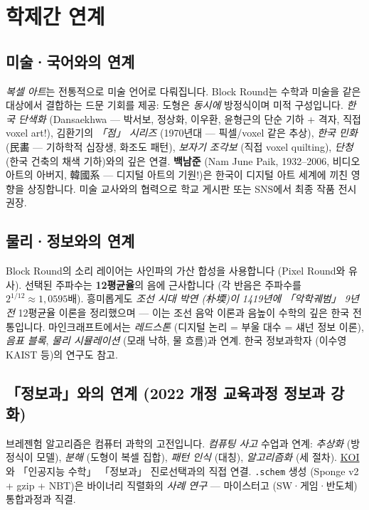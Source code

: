 \documentclass[12pt,a4paper]{scrartcl}
\newcommand{\acc}[1]{\textcolor{accent}{\textbf{#1}}}
\begin{document}
\section{학제간 연계}\label{sec:interdisc}

\subsection{미술·국어와의 연계}
\emph{복셀 아트}는 전통적으로 미술 언어로 다뤄집니다. Block Round는 수학과 미술을 같은 대상에서 결합하는 드문 기회를 제공: 도형은 \emph{동시에} 방정식이며 미적 구성입니다. \emph{한국 단색화} (Dansaekhwa --- 박서보, 정상화, 이우환, 윤형근의 단순 기하 + 격자, 직접 voxel art!), 김환기의 \emph{「점」 시리즈} (1970년대 --- 픽셀/voxel 같은 추상), \emph{한국 민화} (民畵 --- 기하학적 십장생, 화조도 패턴), \emph{보자기 조각보} (직접 voxel quilting), \emph{단청} (한국 건축의 채색 기하)와의 깊은 연결. \acc{백남준} (Nam June Paik, 1932--2006, 비디오 아트의 아버지, 韓國系 --- 디지털 아트의 기원!)은 한국이 디지털 아트 세계에 끼친 영향을 상징합니다. 미술 교사와의 협력으로 학교 게시판 또는 SNS에서 최종 작품 전시 권장.

\subsection{물리·정보와의 연계}
Block Round의 소리 레이어는 사인파의 가산 합성을 사용합니다 (Pixel Round와 유사). 선택된 주파수는 \acc{12평균율}의 음에 근사합니다 (각 반음은 주파수를 $2^{1/12} \approx 1{,}0595$배). 흥미롭게도 \emph{조선 시대 박연 (朴堧)이 1419년에 「악학궤범」 9년 전} 12평균율 이론을 정리했으며 --- 이는 조선 음악 이론과 음높이 수학의 깊은 한국 전통입니다. 마인크래프트에서는 \emph{레드스톤} (디지털 논리 = 부울 대수 = 섀넌 정보 이론), \emph{음표 블록}, \emph{물리 시뮬레이션} (모래 낙하, 물 흐름)과 연계. 한국 정보과학자 (이수영 KAIST 등)의 연구도 참고.

\subsection{「정보과」와의 연계 (2022 개정 교육과정 정보과 강화)}
브레젠험 알고리즘은 컴퓨터 과학의 고전입니다. \emph{컴퓨팅 사고} 수업과 연계: \emph{추상화} (방정식이 모델), \emph{분해} (도형이 복셀 집합), \emph{패턴 인식} (대칭), \emph{알고리즘화} (세 절차). \hyperref[sec:olympiad]{KOI}와 「인공지능 수학」 「정보과」 진로선택과의 직접 연결. \texttt{.schem} 생성 (Sponge v2 + gzip + NBT)은 바이너리 직렬화의 \emph{사례 연구} --- 마이스터고 (SW·게임·반도체) 통합과정과 직결.
\end{document}
